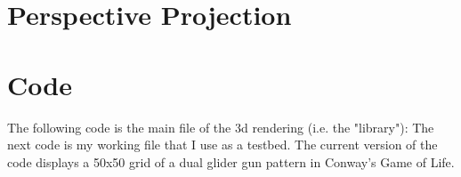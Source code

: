 \documentclass[12pt]{article}
\begin{document}
	\section{Perspective Projection}
	
	\newpage
	\section{Code}
	The following code is the main file of the 3d rendering (i.e. the "library"):
	{\scriptsize{}}
	\newpage
	The next code is my working file that I use as a testbed. The current version of the code displays a 50x50 grid of a dual glider gun pattern in Conway's Game of Life.
	{\scriptsize{}}
\end{document}
